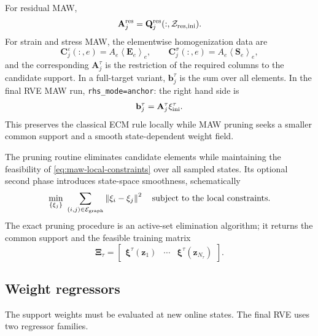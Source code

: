 \documentclass[11pt,a4paper]{article}
\newcommand{\norm}[1]{\left\lVert #1 \right\rVert}
\newcommand{\avg}[1]{\left\langle #1 \right\rangle}
\newcommand{\vect}[1]{\mathbf{#1}}
\newcommand{\mat}[1]{\mathbf{#1}}
\newcommand{\set}[1]{\mathcal{#1}}
\begin{document}
For residual MAW,
\begin{equation}
  \mat A_j^{\rm res}
  =\mat Q_j^{\rm res}(:,\set Z_{{\rm res},\rm ini}).
  \label{eq:maw-res-A}
\end{equation}
For strain and stress MAW, the elementwise homogenization data are
\begin{equation}
  \mat C_j^{\varepsilon}(:,e)=A_e\avg{\mat E_e}_e,
  \qquad
  \mat C_j^{\sigma}(:,e)=A_e\avg{\mat S_e}_e,
  \label{eq:maw-hom-data}
\end{equation}
and the corresponding \(\mat A_j^\tau\) is the restriction of the required
columns to the candidate support.  In a full-target variant,
\(\vect b_j^\tau\) is the sum over all elements.  In the final RVE MAW run,
\texttt{rhs\_mode=anchor}: the right hand side is
\begin{equation}
  \vect b_j^\tau
  =\mat A_j^\tau\vect\xi_{\rm ini}^\tau.
  \label{eq:maw-anchor-target}
\end{equation}
This preserves the classical ECM rule locally while MAW pruning seeks a
smaller common support and a smooth state-dependent weight field.

The pruning routine eliminates candidate elements while maintaining the
feasibility of \cref{eq:maw-local-constraints} over all sampled states.
Its optional second phase introduces state-space smoothness, schematically
\begin{equation}
  \min_{\{\vect\xi_j\}}\ 
  \sum_{(i,j)\in\set E_{\rm graph}}
  \norm{\vect\xi_i-\vect\xi_j}^2
  \quad\text{subject to the local constraints.}
  \label{eq:maw-smoothness}
\end{equation}
The exact pruning procedure is an active-set elimination algorithm; it
returns the common support and the feasible training matrix
\begin{equation}
  \mat\Xi_\tau
  =\begin{bmatrix}
    \vect\xi^\tau(\vect z_1)&\cdots&\vect\xi^\tau(\vect z_{N_\tau})
  \end{bmatrix}.
  \label{eq:maw-weight-training-data}
\end{equation}

\subsection{Weight regressors}

The support weights must be evaluated at new online states.  The final RVE
uses two regressor families.
\end{document}
